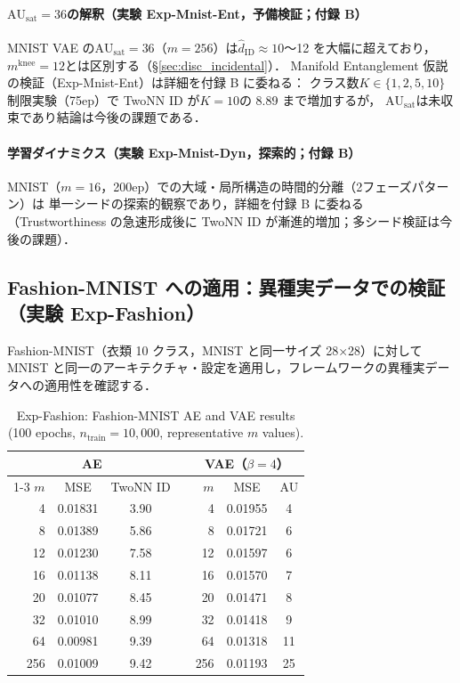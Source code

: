 \documentclass[11pt,a4paper]{jsarticle}
\newcommand{\AUsat}{\mathrm{AU}_{\mathrm{sat}}}
\newcommand{\mknee}{m^{\mathrm{knee}}}
\begin{document}
\paragraph{$\AUsat = 36$の解釈（実験 Exp-Mnist-Ent，予備検証；付録 B）}
MNIST VAE の$\AUsat = 36$（$m=256$）は$\hat{d}_\mathrm{ID} \approx 10$〜12 を大幅に超えており，
$\mknee = 12$とは区別する（§\ref{sec:disc_incidental}）．
Manifold Entanglement 仮説の検証（Exp-Mnist-Ent）は詳細を付録 B に委ねる：
クラス数$K \in \{1,2,5,10\}$制限実験（75ep）で TwoNN ID が$K=10$の 8.89 まで増加するが，
$\AUsat$は未収束であり結論は今後の課題である．

\paragraph{学習ダイナミクス（実験 Exp-Mnist-Dyn，探索的；付録 B）}
MNIST（$m=16$，200ep）での大域・局所構造の時間的分離（2フェーズパターン）は
単一シードの探索的観察であり，詳細を付録 B に委ねる
（Trustworthiness の急速形成後に TwoNN ID が漸進的増加；多シード検証は今後の課題）．

\subsection{Fashion-MNIST への適用：異種実データでの検証（実験 Exp-Fashion）}\label{sec:exp_fashion}

Fashion-MNIST（衣類 10 クラス，MNIST と同一サイズ 28×28）に対して
MNIST と同一のアーキテクチャ・設定を適用し，フレームワークの異種実データへの適用性を確認する．

\begin{table}[H]
\centering
\caption{Exp-Fashion: Fashion-MNIST AE and VAE results (100 epochs, $n_\mathrm{train}=10{,}000$, representative $m$ values).}
\label{tab:ef}
\small
\begin{tabular}{rcccrcc}
\toprule
\multicolumn{3}{c}{AE} & \phantom{xx} & \multicolumn{3}{c}{VAE（$\beta=4$）} \\
\cmidrule{1-3}\cmidrule{5-7}
$m$ & MSE & TwoNN ID && $m$ & MSE & AU \\
\midrule
 4  & 0.01831 & 3.90 && 4  & 0.01955 & 4  \\
 8  & 0.01389 & 5.86 && 8  & 0.01721 & 6  \\
12  & 0.01230 & 7.58 && 12 & 0.01597 & 6  \\
16  & 0.01138 & 8.11 && 16 & 0.01570 & 7  \\
20  & 0.01077 & 8.45 && 20 & 0.01471 & 8  \\
32  & 0.01010 & 8.99 && 32 & 0.01418 & 9  \\
64  & 0.00981 & 9.39 && 64 & 0.01318 & 11 \\
256 & 0.01009 & 9.42 && 256& 0.01193 & 25 \\
\bottomrule
\end{tabular}
\end{table}
\end{document}
